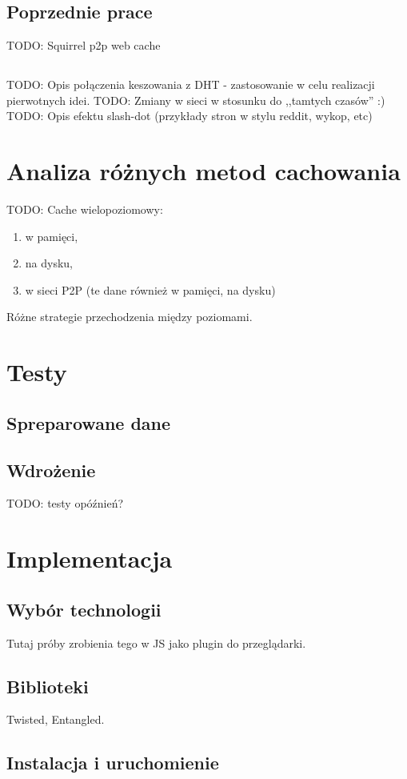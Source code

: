 \documentclass[a4paper,11pt]{scrartcl}
\begin{document}
\subsection{Poprzednie prace}
TODO: Squirrel p2p web cache \cite{iyer2002squirrel}

\subsection{}
TODO: Opis połączenia keszowania z DHT - zastosowanie w celu realizacji pierwotnych idei. 
TODO: Zmiany w sieci w stosunku do ,,tamtych czasów'' :)
TODO: Opis efektu slash-dot (przykłady stron w stylu reddit, wykop, etc)

\section{Analiza różnych metod cachowania}
TODO:
Cache wielopoziomowy:
\begin{enumerate}
  \item w pamięci,
  \item na dysku,
  \item w sieci P2P (te dane również w pamięci, na dysku)
\end{enumerate}
Różne strategie przechodzenia między poziomami.

\section{Testy}
\subsection{Spreparowane dane}


\subsection{Wdrożenie}
TODO: testy opóźnień?

\section{Implementacja}
\subsection{Wybór technologii}
Tutaj próby zrobienia tego w JS jako plugin do przeglądarki.
\subsection{Biblioteki}
Twisted, Entangled.
\subsection{Instalacja i uruchomienie}





\end{document}
